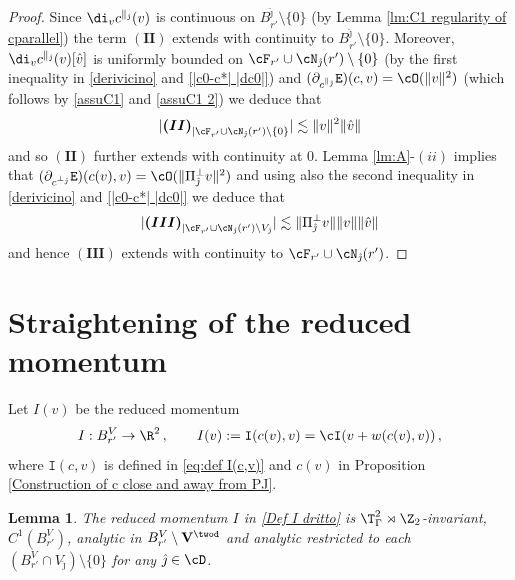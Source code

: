 \documentclass[11pt,a4paper,reqno]{article}
\numberwithin{equation}{section}
\newtheorem{lemma}[theorem]{Lemma}
\theoremstyle{definition}
\begin{document}
\begin{proof}
        Since $\di_v c^{\parallel_{\hat \jmath}}(v)$ is continuous on $B_{r'}^{\hat \jmath}\setminus\{0\}$ (by Lemma \ref{lm:C1 regularity of cparallel}) the term $\boldsymbol{(II)}$ extends with continuity to $B_{r'}^{\hat \jmath}\setminus \{0\}$.
        Moreover, $\di_v c^{\parallel_{\hat \jmath}}(v)[\hat v]$ is uniformly bounded on $\cF_{r'}\cup \cN_{\hat \jmath}(r')\setminus\{0\}$ 
        (by the first inequality in \eqref{derivicino} and \eqref{|c0-c*| |dc0|})
         and $(\partial_{c^{\parallel_{\hat \jmath}}}{\mathtt E}) (c,v)=\cO(\|v\|^2)$ (which follows by \eqref{assuC1} and \eqref{assuC1 2}) we deduce that 
        $$
        |\boldsymbol{(II)}_{|\cF_{r'}\cup \cN_{\hat \jmath}(r')\setminus\{0\}}| \lesssim \| v \|^2 \|\hat v\|
        $$ 
        and so $\boldsymbol{(II)}$ further extends with continuity at $0$.
        Lemma 
        \ref{lm:A}-$(ii)$ implies that $(\partial_{c^{\bot_{\hat \jmath}}}{\mathtt E}) (c(v),v)=\cO(\|\Pi_{\hat \jmath}^\bot v\|^2)$ and using also the second inequality in \eqref{derivicino} and \eqref{|c0-c*| |dc0|} we deduce that $$|\boldsymbol{(III)}_{|\cF_{r'}\cup \cN_{\hat \jmath}(r')\setminus V_{\hat \jmath}}|\lesssim \|\Pi_{\hat \jmath}^\bot v\|\|v\|\|\hat v\|$$ 
        and hence $\boldsymbol{(III)}$ extends with continuity to $\cF_{r'}\cup \cN_{\hat \jmath}(r')$. 
        \end{proof}
    
    \section{Straightening of the reduced momentum}\label{sec:diritto}

    Let $ I(v)$  be the reduced momentum 
\begin{equation}\label{Def I dritto}
I : B_{r'}^V \to \R^2 \, , \qquad 
    I(v) := {\mathtt I} (c(v),v) =
    \cI(v+w(c(v),v)) \, , 
\end{equation}
where $ {\mathtt I} (c,v) $ is defined in \eqref{eq:def I(c,v)} and $c(v)$ in Proposition 
\ref{Construction of c close and away from PJ}. 

\begin{lemma}\label{lem:regI}
The reduced momentum  $ I $ in 
\eqref{Def I dritto}   
is $\T^2_\Gamma\rtimes \Z_2$-invariant, $C^1(B_{r'}^V)$, analytic  in 
    $ B_{r'}^V \setminus  {\bf V}^{\twod}$ and analytic restricted to each  $(B_{r'}^V\cap V_{\hat \jmath})\setminus\{0\}$ for any $ {\hat \jmath} \in \cD$.
\end{lemma}
\end{document}
